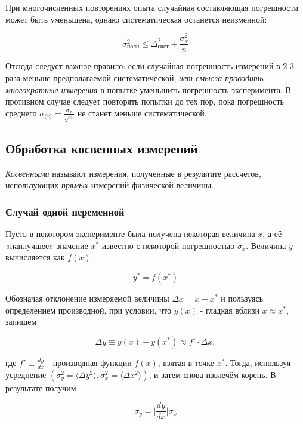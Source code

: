 \documentclass[12pt]{article}
\begin{document}
      При многочисленных повторениях опыта случайная составляющая погрешности
      может быть уменьшена, однако систематическая останется неизменной:

      $$
        \sigma_{полн}^2 \leqslant \Delta_{сист}^2 + \frac{\sigma_x^2}{n}
      $$

      Отсюда следует важное правило: если случайная погрешность измерений в 2-3
      раза меньше предполагаемой систематической, \textit{нет смысла проводить многократные
      измерения} в попытке уменьшить погрешность эксперимента. В противном случае
      следует повторять попытки до тех пор, пока погрешность среднего
      $\sigma_{\langle x \rangle} = \frac{\sigma_x}{\sqrt{n}}$ не станет меньше систематической.

    \subsection{Обработка косвенных измерений}

      \textit{Косвенными} называют измерения, полученные в результате рассчётов,
      использующих \textit{прямых} измерений физической величины.

      \subsubsection{Случай одной переменной}

        Пусть в некотором эксперименте была получена некоторая величина $x$, а её
        «наилучшее» значение $x^*$ известно с некоторой погрешностью $\sigma_x$.
        Величина $y$ вычисляется как $f(x)$.

        $$
          y^* = f(x^*)
        $$

        Обозначая отклонение измеряемой величины $\Delta x = x - x^*$ и пользуясь
        определением производной, при условии, что $y(x)$ - гладкая вблизи $x \approx x^*$,
        запишем

        $$
          \Delta y \equiv y(x) - y(x^*) \approx f' \cdot \Delta x,
        $$

        где $f' \equiv \frac{dy}{dx}$ - производная функции $f(x)$, взятая в точке
        $x^*$. Тогда, используя усреднение
        $(\sigma_y^2 = \langle \Delta y^2 \rangle, \sigma_x^2 = \langle \Delta x^2 \rangle)$,
        и затем снова извлечём корень. В результате получим

        \begin{equation}
          \sigma_y = \bigg|\frac{dy}{dx}\bigg| \sigma_x
        \end{equation}
\end{document}
